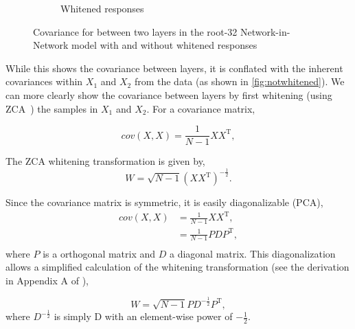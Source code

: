 \documentclass[thesis]{subfiles}
\begin{document}
\begin{figure}[tbp]
\begin{subfigure}[b]{0.45\linewidth}
			\caption{Whitened responses}
			\label{fig:whitened}
		\end{subfigure}
		\caption{Covariance for between two layers in the root-32 Network-in-Network model with and without whitened responses}
		\label{fig:whitevsnot}
	\end{figure}
	
	While this shows the covariance between layers, it is conflated with the inherent covariances within $X_1$ and $X_2$ from the data (as shown in \cref{fig:notwhitened}). We can more clearly show the covariance between layers by first whitening (using ZCA~\cite{CIFAR10}) the samples in $X_1$ and $X_2$. For a covariance matrix,
	
	\begin{equation}
	cov(X, X) = \frac{1}{N-1} XX^\textrm{T},
	\end{equation}
	
	The ZCA whitening transformation is given by,
	\begin{equation}
	W = \sqrt{N-1}\left(XX^\textrm{T}\right)^{-\frac{1}{2}}.
	\end{equation}
	
	Since the covariance matrix is symmetric, it is easily diagonalizable (\ie PCA),
	\begin{align}
	cov(X, X) &= \frac{1}{N-1} XX^\textrm{T},\\
	&=\frac{1}{N-1} PDP^\textrm{T},\\
	\end{align}
	where $P$ is a orthogonal matrix and $D$ a diagonal matrix. This diagonalization allows a simplified calculation of the whitening transformation (see the derivation in Appendix A of \cite{CIFAR10}),
	
	\begin{equation}
	W = \sqrt{N-1}PD^{-\frac{1}{2}}P^\textrm{T},
	\end{equation}
	where $D^{-\frac{1}{2}}$ is simply D with an element-wise power of $-\frac{1}{2}$.
	
\end{document}
